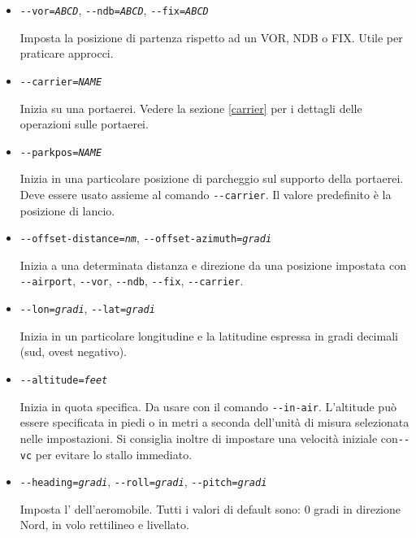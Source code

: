 \begin{itemize}
{\begin{itemize}
  \item{\texttt{-$ $-vor={\it ABCD}}, \texttt{-$ $-ndb={\it ABCD}}, \texttt{-$ $-fix={\it ABCD}}}

  Imposta la posizione di partenza rispetto ad un VOR, NDB o FIX. Utile per praticare approcci.

  \item{\texttt{-$ $-carrier={\it NAME}}}

  Inizia su una portaerei. Vedere la sezione \ref{carrier} per i dettagli delle operazioni sulle portaerei.

  \item{\texttt{-$ $-parkpos={\it NAME}}}

  Inizia in una particolare posizione di parcheggio sul supporto della portaerei.
  Deve essere usato assieme al comando \texttt{-$ $-carrier}.
  Il valore predefinito \`{e} la posizione di lancio.

  \item{\texttt{-$ $-offset-distance={\it nm}}, \texttt{-$ $-offset-azimuth={\it gradi}}}

  Inizia a una determinata distanza e direzione da una posizione impostata con \texttt{-$ $-airport},
  \texttt{-$ $-vor}, \texttt{-$ $-ndb}, \texttt{-$ $-fix}, \texttt{-$ $-carrier}.

  \item{\texttt{-$ $-lon={\it gradi}}, \texttt{-$ $-lat={\it gradi}}}

  Inizia in un particolare longitudine e la latitudine espressa in gradi decimali (sud, ovest negativo).

  \item{\texttt{-$ $-altitude={\it feet}}}

  Inizia in quota specifica. Da usare con il comando \texttt{-$ $-in-air}.
  L'altitude pu\`{o} essere specificata in piedi o in metri a seconda
  dell'unit\`{a} di misura selezionata nelle impostazioni. Si consiglia
  inoltre di impostare una velocit\`{a} iniziale con\texttt{-$ $-vc} per evitare lo stallo immediato.

  \item{\texttt{-$ $-heading={\it gradi}}, \texttt{-$ $-roll={\it gradi}}, \texttt{-$ $-pitch={\it gradi}}}

  Imposta l' dell'aeromobile. Tutti i valori di default sono:
  0 gradi in direzione Nord, in volo rettilineo e livellato.


\end{itemize}}
\end{itemize}

